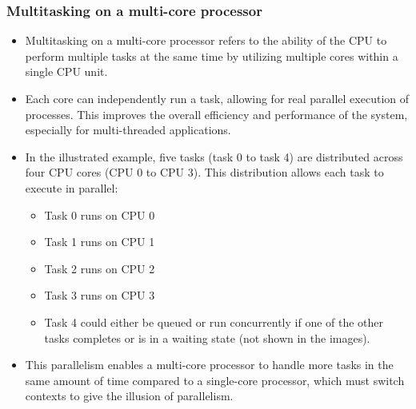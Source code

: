 \documentclass[12pt]{article}
\begin{document}
\subsubsection{Multitasking on a multi-core processor}

\begin{itemize}
    \item Multitasking on a multi-core processor refers to the ability of the CPU to perform multiple tasks at the same time by utilizing multiple cores within a single CPU unit.
    \item Each core can independently run a task, allowing for real parallel execution of processes. This improves the overall efficiency and performance of the system, especially for multi-threaded applications.
    \item In the illustrated example, five tasks (task 0 to task 4) are distributed across four CPU cores (CPU 0 to CPU 3). This distribution allows each task to execute in parallel:
    \begin{itemize}
        \item Task 0 runs on CPU 0
        \item Task 1 runs on CPU 1
        \item Task 2 runs on CPU 2
        \item Task 3 runs on CPU 3
        \item Task 4 could either be queued or run concurrently if one of the other tasks completes or is in a waiting state (not shown in the images).
    \end{itemize}
    \item This parallelism enables a multi-core processor to handle more tasks in the same amount of time compared to a single-core processor, which must switch contexts to give the illusion of parallelism.
\end{itemize}
\end{document}
